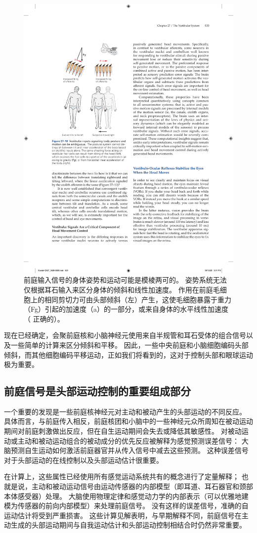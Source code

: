 \begin{figure}[htbp]
	\centering
	\includegraphics[width=0.5\linewidth]{chap27/fig_27_10}
	\caption{前庭输入信号的身体姿势和运动可能是模棱两可的。 姿势系统无法仅根据耳石输入来区分身体的倾斜和线性加速度。 作用在前庭毛细胞上的相同剪切力可由头部倾斜（左）产生，这使毛细胞暴露于重力（Fg）引起的加速度（a）的一部分，或来自身体的水平线性加速度（ 正确的）。}
	\label{fig:27_10}
\end{figure}


现在已经确定，会聚前庭核和小脑神经元使用来自半规管和耳石受体的组合信号以及一些简单的计算来区分倾斜和平移。
因此，一些中央前庭和小脑细胞编码头部倾斜，而其他细胞编码平移运动，正如我们将看到的，这对于控制头部和眼球运动极为重要。


\subsection{前庭信号是头部运动控制的重要组成部分}

一个重要的发现是一些前庭核神经元对主动和被动产生的头部运动的不同反应。
具体而言，与前庭传入相反，前庭核团和小脑中的一些神经元众所周知在被动运动期间对前庭刺激做出反应，但在自生运动期间会失去或降低其敏感性。
对被动运动或主动和被动运动组合的被动成分的优先反应被解释为感觉预测误差信号：
大脑预测自生运动如何激活前庭器官并从传入信号中减去这些预测。
这种误差信号对于头部运动的在线控制以及头部运动估计很重要。


在计算上，这些属性已经使用所有感觉运动系统共有的概念进行了定量解释；
也就是说，主动和被动运动信号由运动传感器的内部模型（即耳道、耳石器官和颈部本体感受器）处理。
大脑使用物理定律和感觉动力学的内部表示（可以优雅地建模为传感器的前向内部模型）来处理前庭信号。
没有这样的误差信号，准确的自运动估计将受到严重损害。
这些计算见解表明，与早期解释不同，前庭信号在主动生成的头部运动期间与自我运动估计和头部运动控制相结合时仍然非常重要。


